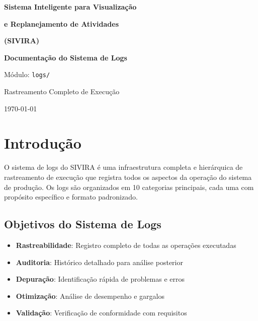 \documentclass[11pt,a4paper]{article}
\begin{document}
\begin{titlepage}
    \centering
    \vspace*{3cm}

    {\Huge\bfseries Sistema Inteligente para Visualização\par}
    {\Huge\bfseries e Replanejamento de Atividades\par}
    \vspace{0.5cm}
    {\Large\bfseries (SIVIRA)\par}

    \vspace{2cm}
    {\LARGE\bfseries Documentação do Sistema de Logs\par}

    \vspace{2cm}
    {\large Módulo: \texttt{logs/}\par}

    \vspace{1cm}
    {\large Rastreamento Completo de Execução\par}

    \vfill

    {\large \today\par}
\end{titlepage}

\tableofcontents
\newpage

\section{Introdução}

O sistema de logs do SIVIRA é uma infraestrutura completa e hierárquica de rastreamento de execução que registra todos os aspectos da operação do sistema de produção. Os logs são organizados em 10 categorias principais, cada uma com propósito específico e formato padronizado.

\subsection{Objetivos do Sistema de Logs}

\begin{itemize}
    \item \textbf{Rastreabilidade}: Registro completo de todas as operações executadas
    \item \textbf{Auditoria}: Histórico detalhado para análise posterior
    \item \textbf{Depuração}: Identificação rápida de problemas e erros
    \item \textbf{Otimização}: Análise de desempenho e gargalos
    \item \textbf{Validação}: Verificação de conformidade com requisitos
\end{itemize}
\end{document}
